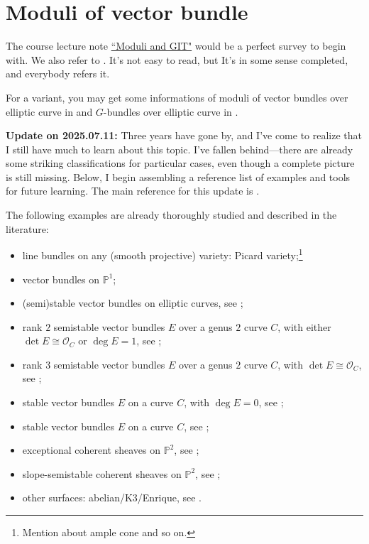 \section{Moduli of vector bundle}
The course lecture note \href{https://userpage.fu-berlin.de/hoskins/moduli_and_GIT.html}{``Moduli and GIT"} would be a perfect survey to begin with. We also refer to \cite{huybrechts2010geometry}. It's not easy to read, but It's in some sense completed, and everybody refers it.

For a variant, you may get some informations of moduli of vector bundles over elliptic curve in \cite{atiyah1957vector} and $G$-bundles over elliptic curve in \cite{frăţilă2020revisiting}.

\textbf{Update on 2025.07.11:} Three years have gone by, and I’ve come to realize that I still have much to learn about this topic. I’ve fallen behind—there are already some striking classifications for particular cases, even though a complete picture is still missing. Below, I begin assembling a reference list of examples and tools for future learning. The main reference for this update is \cite{MS19}.

The following examples are already thoroughly studied and described in the literature:
\begin{itemize}
\item line bundles on any (smooth projective) variety: Picard variety;\footnote{Mention about ample cone and so on.}
\item vector bundles on $\mathbb{P}^1$;
\item (semi)stable vector bundles on elliptic curves, see \cite[Example 2.7]{MS19};
\item rank $2$ semistable vector bundles $E$ over a genus $2$ curve $C$, with either $\det E \cong \mathcal{O}_C$ or $\deg E = 1$, see \cite[Example 2.18,2.19]{MS19};
\item rank $3$ semistable vector bundles $E$ over a genus $2$ curve $C$, with $\det E \cong \mathcal{O}_C$, see \cite[Example 2.20]{MS19};
\item stable vector bundles $E$ on a curve $C$, with $\deg E = 0$, see \cite[Theorem 2.14]{MS19};
\item stable vector bundles $E$ on a curve $C$, see \cite[Theorem 2.10]{MS19};
\item exceptional coherent sheaves on $\mathbb{P}^2$, see \cite[1.1]{LZ19};
\item slope-semistable coherent sheaves on $\mathbb{P}^2$, see \cite[Theorem 1.8]{LZ19};
\item other surfaces: abelian/K3/Enrique, see \cite[p3]{MS19}.
\end{itemize}

